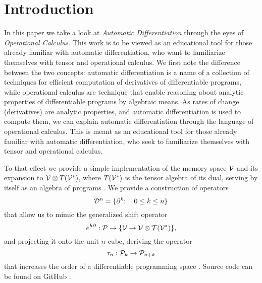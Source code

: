 \section{Introduction}\label{sec:introduction}

In this paper we take a look at \emph{Automatic Differentiation} through the eyes of \emph{Operational Calculus}. This work is to be viewed as an educational tool for those already familiar with automatic differentiation, who want to familiarize themselves with tensor and operational calculus. We first note the difference between the two concepts: automatic differentiation is a name of a collection of techniques for efficient computation of derivatives of differentiable programs, while operational calculus are technique that enable reasoning about analytic properties of differentiable programs by algebraic means. As rates of change (derivatives) are analytic properties, and automatic differentiation is used to compute them, we can explain automatic differentiation through the language of operational calculus. This is meant as an educational tool for those already familiar with automatic differentiation, who seek to familiarize themselves with tensor and operational calculus.

To that effect we provide a simple implementation of the memory space $\mathcal{V}$ and its expansion to $\mathcal{V}\otimes T(\mathcal{V}^*)$, where $T(\mathcal{V}^*)$ is the tensor algebra of its dual, serving by itself as an algebra of programs \cite[Definition~4.1]{OperationalCalculus}.
We provide a construction of operators
\begin{equation}
\mathcal{D}^n=\{\partial^k;\quad 0\le k\le n\}
\end{equation}
that allow us to mimic the generalized shift operator \cite[Theorem~5.2]{OperationalCalculus}
 \begin{equation}
   e^{h\partial}:\mathcal{P}\to \{\mathcal{V}\to \mathcal{V}\otimes \mathcal{T}(\mathcal{V}^*)\},
         \end{equation}
and projecting it onto the unit $n$-cube, deriving the operator 
\begin{equation}\label{eq:sumd}
\tau_n:\mathcal{P}_k\to\mathcal{P}_{n+k}
\end{equation} 
that increases the order of a differentiable programming space \cite[Proposition~5.1]{OperationalCalculus}.
Source code can be found on GitHub \cite{dCpp}.

